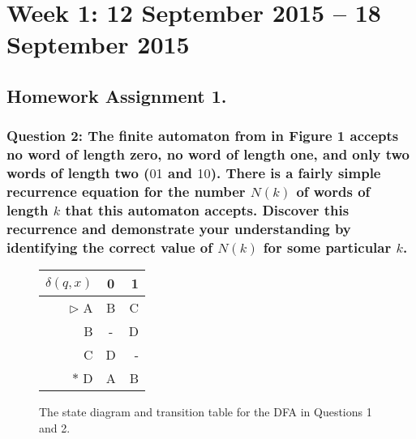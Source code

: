 \section*{Week 1: 12 September 2015 -- 18 September 2015}

\subsection*{Homework Assignment 1.}

\subsubsection*{Question 2: The finite automaton from in Figure 1 accepts no word of length zero, no word of length one, and only two words of length two ($01$ and $10$). There is a fairly simple recurrence equation for the number $N(k)$ of words of length $k$ that this automaton accepts. Discover this recurrence and demonstrate your understanding by identifying the correct value of $N(k)$ for some particular $k$.}
\begin{figure}[hl]
\centering
\setlength\tabcolsep{10pt}
\begin{minipage}{0.48\textwidth}
\centering
{}
\end{minipage}
\begin{minipage}{0.48\textwidth}
\centering
\begin{tabular}{r|c|r}
$\delta(q,x)$ & 0 & 1 \\
\hline
$\rhd$ A & B & C \\
       B & - & D \\
       C & D & - \\
$\ast$ D & A & B\\
\end{tabular}
\label{tab:ttable1}
\end{minipage}
\caption{The state diagram and transition table for the DFA in Questions 1 and 2.}
\end{figure}
